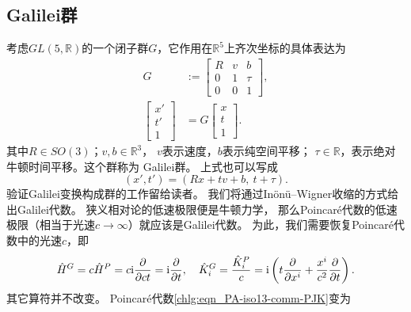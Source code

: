\subsection{Galilei群}
考虑$GL(5, \mathbb{R})$的一个闭子群$G$，它作用在$\mathbb{R}^5$上齐次坐标的具体表达为
\begin{equation}\label{chlg:eqn_Galilei-max}
\begin{aligned}
    G&:=\begin{bmatrix}  R & v & b \\0 & 1 & \tau \\ 0 &0 & 1  \end{bmatrix},\\
    \begin{bmatrix}  x' \\ t'\\ 1 \end{bmatrix}&=G\begin{bmatrix}  x \\t\\ 1 \end{bmatrix}.
\end{aligned}
\end{equation}
其中$R \in S O(3)$；$v, b \in \mathbb{R}^3$，
$v$表示速度，$b$表示纯空间平移；
$\tau \in \mathbb{R}$，表示绝对牛顿时间平移。这个群称为 {Galilei群}。
上式也可以写成
\begin{equation}
    (x', t') = (R x+t v+ b,\ t+\tau) .
\end{equation}
验证Galilei变换构成群的工作留给读者。
我们将通过In\"on\"u--Wigner{收缩}的方式给出Galilei代数。
狭义相对论的低速极限便是牛顿力学，
那么Poincar\'{e}代数的低速极限（相当于光速$c\to \infty$）就应该是Galilei代数。
为此，我们需要恢复Poincar\'{e}代数中的光速$c$，即
\begin{equation}
    \hat{H}^G =c\hat{H}^P = c\mathrm{i} \frac{\partial }{ \partial ct }
    = \mathrm{i} \frac{\partial }{ \partial t }, \quad
    \hat{K}_i^G = \frac{\hat{K}_i^P}{c}= \mathrm{i} \left(t\frac{\partial }{\partial x^i}+
    \frac{x^i}{c^2}\frac{\partial }{\partial t}\right) .
\end{equation}
其它算符并不改变。
Poincar\'{e}代数\eqref{chlg:eqn_PA-iso13-comm-PJK}变为
